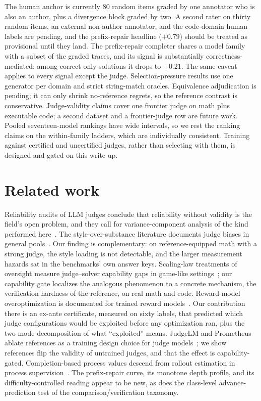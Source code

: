 \documentclass[11pt]{article}
\begin{document}
The human anchor is currently 80 random items graded by one annotator who is also an author, plus a divergence block graded by two.
A second rater on thirty random items, an external non-author annotator, and the code-domain human labels are pending, and the prefix-repair headline ($+0.79$) should be treated as provisional until they land.
The prefix-repair completer shares a model family with a subset of the graded traces, and its signal is substantially correctness-mediated: among correct-only solutions it drops to $+0.21$.
The same caveat applies to every signal except the judge.
Selection-pressure results use one generator per domain and strict string-match oracles.
Equivalence adjudication is pending; it can only shrink no-reference regrets, so the reference contrast is conservative.
Judge-validity claims cover one frontier judge on math plus executable code; a second dataset and a frontier-judge row are future work.
Pooled seventeen-model rankings have wide intervals, so we rest the ranking claims on the within-family ladders, which are individually consistent.
Training against certified and uncertified judges, rather than selecting with them, is designed and gated on this write-up.

\section{Related work}
\label{sec:related}

Reliability audits of LLM judges conclude that reliability without validity is the field's open problem, and they call for variance-component analysis of the kind performed here~\cite{zheng2023judging,tan2024judgebench}.
The style-over-substance literature documents judge biases in general pools~\cite{wu2023style,dubois2024length,singhal2023long}.
Our finding is complementary: on reference-equipped math with a strong judge, the style loading is not detectable, and the larger measurement hazards sat in the benchmarks' own answer keys.
Scaling-law treatments of oversight measure judge--solver capability gaps in game-like settings~\cite{engels2025scaling}; our capability gate localizes the analogous phenomenon to a concrete mechanism, the verification hardness of the reference, on real math and code.
Reward-model overoptimization is documented for trained reward models~\cite{gao2022scaling,skalse2022defining,coste2023ensembles,eisenstein2023helping}.
Our contribution there is an ex-ante certificate, measured on sixty labels, that predicted which judge configurations would be exploited before any optimization ran, plus the two-mode decomposition of what ``exploited'' means.
JudgeLM and Prometheus ablate references as a training design choice for judge models~\cite{zhu2023judgelm,kim2024prometheus2}; we show references flip the validity of untrained judges, and that the effect is capability-gated.
Completion-based process values descend from rollout estimation in process supervision~\cite{lightman2023verify,wang2022selfconsistency}.
The prefix-repair curve, its monotone depth profile, and its difficulty-controlled reading appear to be new, as does the class-level advance-prediction test of the comparison/verification taxonomy.
\end{document}
